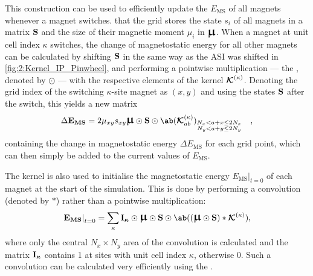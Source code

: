 This construction can be used to efficiently update the  $E_\mathrm{MS}$ of all magnets whenever a magnet switches.
 that the grid stores the state $s_i$ of all magnets in a matrix $\boldsymbol{\mathbf{S}}$ and the size of their magnetic moment $\mu_i$ in $\vc{\bigmu}$.
When a magnet at unit cell index $\kappa$ switches, the change of magnetostatic energy for all other magnets can be calculated by shifting $\boldsymbol{\mathbf{S}}$ in the same way as the ASI was shifted in \cref{fig:2:Kernel_IP_Pinwheel}, and performing a pointwise multiplication --- the , denoted by $\odot$ --- with the respective elements of the kernel $\boldsymbol{\mathbf{\mathcal{K}}}^{(\kappa)}$.
Denoting the grid index of the switching $\kappa$-site magnet as $(x,y)$ and using the states $\boldsymbol{\mathbf{S}}$ after the switch, this yields a new matrix
\begin{equation}
	\label{eq:2:Kernel_update}
	\Delta \vc{E_\mathrm{MS}} = 2\mu_{xy} s_{xy}\vc{\bigmu} \odot \vc{S} \odot \ab(\vc{\mathcal{K}}^{(\kappa)}_{ab})_{\substack{N_x < a + x \leq 2N_x \\ N_y < a + y \leq 2N_y}} \quad\mathrm{,}
\end{equation}
containing the change in magnetostatic energy $\Delta E_\mathrm{MS}$ for each grid point, which can then simply be added to the current values of $E_\mathrm{MS}$. \par
The kernel is also used to initialise the magnetostatic energy $\left. E_\mathrm{MS} \right|_{t=0}$ of each magnet at the start of the simulation.
This is done by performing a convolution (denoted by $*$) rather than a pointwise multiplication:
\begin{equation}
	\label{eq:2:Kernel_init}
	\left. \vc{E_\mathrm{MS}} \right|_{t=0} = \sum_\kappa \vc{I_\kappa} \odot \vc{\bigmu} \odot \vc{S} \odot \ab((\vc{\bigmu} \odot \vc{S}) * \vc{\mathcal{K}}^{(\kappa)}) \mathrm{,}
\end{equation}
where only the central $N_x \times N_y$ area of the convolution is calculated and the matrix $\boldsymbol{\mathbf{I_\kappa}}$ contains 1 at sites with unit cell index $\kappa$, otherwise 0.
Such a convolution can be calculated very efficiently using the . \\\par

